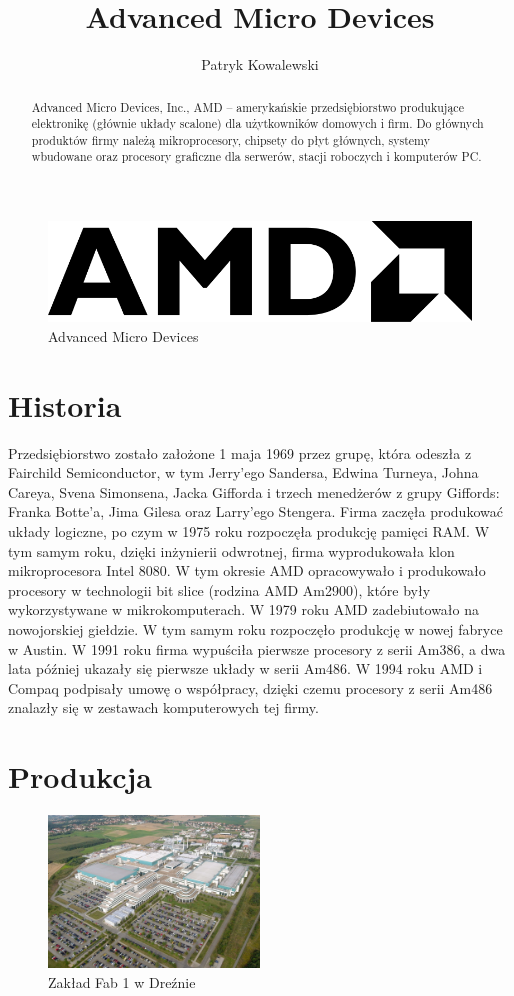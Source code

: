 \documentclass[a4paper,12pt]{article}
\title{Advanced Micro Devices}
\author{Patryk Kowalewski}
\begin{document}
\maketitle

\begin{abstract}\noindent Advanced Micro Devices, Inc., AMD – amerykańskie przedsiębiorstwo produkujące elektronikę (głównie układy scalone) dla użytkowników domowych i firm. Do głównych produktów firmy należą mikroprocesory, chipsety do płyt głównych, systemy wbudowane oraz procesory graficzne dla serwerów, stacji roboczych i komputerów PC.
\end{abstract}

\begin{figure}[h]
\centering
\includegraphics[width=0.3\hsize]{amd.png}
\caption{Advanced Micro Devices}\label{AMD}
\end{figure}

\section{Historia}

Przedsiębiorstwo zostało założone 1 maja 1969 przez grupę, która odeszła z Fairchild Semiconductor, w tym Jerry’ego Sandersa, Edwina Turneya, Johna Careya, Svena Simonsena, Jacka Gifforda i trzech menedżerów z grupy Giffords: Franka Botte’a, Jima Gilesa oraz Larry’ego Stengera. Firma zaczęła produkować układy logiczne, po czym w 1975 roku rozpoczęła produkcję pamięci RAM. W tym samym roku, dzięki inżynierii odwrotnej, firma wyprodukowała klon mikroprocesora Intel 8080. W tym okresie AMD opracowywało i produkowało procesory w technologii bit slice (rodzina AMD Am2900), które były wykorzystywane w mikrokomputerach. W 1979 roku AMD zadebiutowało na nowojorskiej giełdzie. W tym samym roku rozpoczęło produkcję w nowej fabryce w Austin.
W 1991 roku firma wypuściła pierwsze procesory z serii Am386, a dwa lata później ukazały się pierwsze układy w serii Am486. W 1994 roku AMD i Compaq podpisały umowę o współpracy, dzięki czemu procesory z serii Am486 znalazły się w zestawach komputerowych tej firmy.

\section{Produkcja}

\begin{figure}[h]
\centering
\includegraphics[width=0.5\textwidth]{fab1.jpg}
\caption{Zakład Fab 1 w Dreźnie}\label{Fab 1}
\end{figure}
\end{document}
